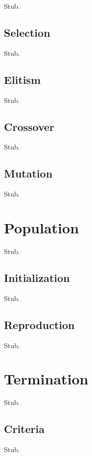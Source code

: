 Stub.

\subsection{Selection}

Stub.

\subsection{Elitism}

Stub.

\subsection{Crossover}

Stub.

\subsection{Mutation}

Stub.

\section{Population}

Stub.

\subsection{Initialization}

Stub.

\subsection{Reproduction}

Stub.

\section{Termination}

Stub.

\subsection{Criteria}

Stub.
